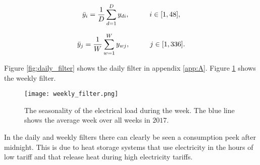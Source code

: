 \begin{equation}\label{eq:daily_filter}
	\bar{y}_i = \frac{1}{D} \sum_{d=1}^D y_{di}, \hspace{10mm} i \in [1,48],
\end{equation} 

\begin{equation}\label{eq:weekly_filter}
	\bar{y}_j = \frac{1}{W} \sum_{w=1}^W y_{wj}, \hspace{10mm}  j \in [1,336].
\end{equation} 



Figure \ref{fig:daily_filter} shows the daily filter in appendix \ref{app:A}. Figure \ref{fig:weekly_filter} shows the weekly filter.

\begin{figure}[h!]
	\centering
	\texttt{[image: weekly\_filter.png]}
	\caption{The seasonality of the electrical load during the week. The blue line shows the average week over all weeks in $ 2017 $. }
	\label{fig:weekly_filter}
\end{figure}



In the daily and weekly filters there can clearly be seen a consumption peek after midnight. This is due to heat storage systems that use electricity in the hours of low tariff and that release heat during high electricity tariffs. 

